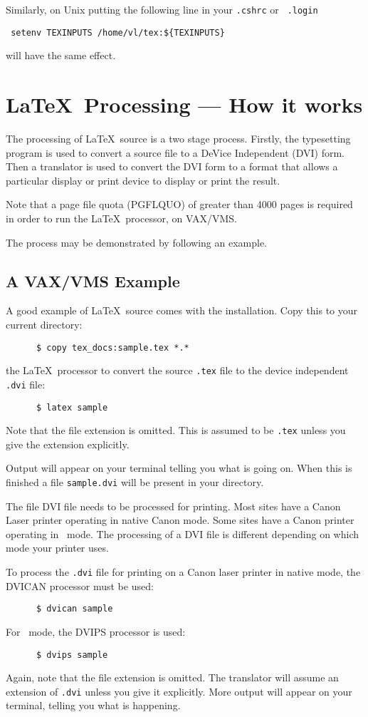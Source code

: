 Similarly, on Unix putting the following line in your {\tt .cshrc} or {\tt
.login}
\begin{verbatim}
 setenv TEXINPUTS /home/vl/tex:${TEXINPUTS}
\end{verbatim}
will have the same effect.



\section{\LaTeX\ Processing --- How it works}
\label{se:works}

The processing of \LaTeX\ source is a two stage process. Firstly, the
typesetting program is used to convert a source file to a DeVice Independent
(DVI) form. Then a translator is used to convert the DVI form to a format that
allows a particular display or print device to display or print the result.

Note that a page file quota (PGFLQUO) of greater than 4000 pages 
is required in order to run the \LaTeX\ processor, on VAX/VMS.

The process may be demonstrated by following an example.

\subsection{A VAX/VMS Example}
\label{se:example}
A good example of \LaTeX\ source comes with the installation.
Copy this to your current directory:
\begin{verbatim}
      $ copy tex_docs:sample.tex *.*
\end{verbatim}
the \LaTeX\ processor to convert the source 
\mbox{\tt .tex} file to the device independent \mbox{\tt .dvi} file:
\begin{verbatim}
      $ latex sample
\end{verbatim}
Note that the file extension is omitted. This is assumed to be \mbox{\tt .tex} 
unless you give the extension explicitly. 

Output will appear on your terminal telling you what is going on. When this is
finished a file \mbox{\tt sample.dvi} will be present in your directory.

The file DVI file needs to be processed for printing. Most sites have a Canon
Laser printer operating in native Canon mode. Some sites have a Canon printer
operating in \PS\ mode. The processing of a DVI file is different
depending on which mode your printer uses.


To process the \mbox{\tt .dvi} file for printing on a Canon laser printer in
native mode, the DVICAN processor must be used:
\begin{verbatim}
      $ dvican sample
\end{verbatim}
For \PS\ mode, the DVIPS processor is used:
\begin{verbatim}
      $ dvips sample
\end{verbatim}
Again, note that the file extension is omitted. The translator will assume an
extension of \mbox{\tt .dvi} unless you give it explicitly. More output will
appear on your terminal, telling you what is happening. 

